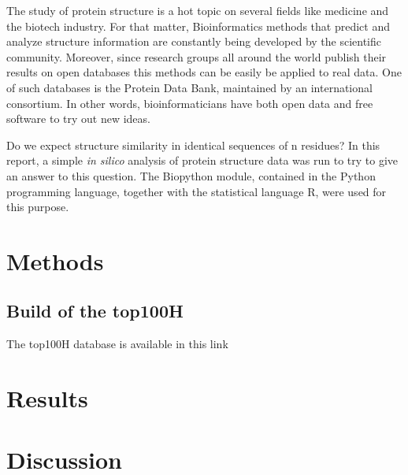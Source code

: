 \documentclass[a4paper, 11pt]{article} %
\begin{document}
The study of protein structure is a hot topic on several fields like medicine and the biotech industry. For that matter, Bioinformatics methods that predict and analyze structure information are constantly being developed by the scientific community. Moreover, since research groups all around the world publish their results on open databases this methods can be easily be applied to real data. One of such databases is the Protein Data Bank, maintained by an international consortium. In other words, bioinformaticians have both open data and free software to try out new ideas.


Do we expect structure similarity in identical sequences of n residues? In this report, a simple \textit{in silico} analysis of protein structure data was run to try to give an answer to this question. The Biopython module, contained in the Python programming language, together with the statistical language R, were used for this purpose.


\section{Methods}

\subsection{Build of the top100H}

The top100H database is available in this link

\section{Results}

\section{Discussion}
\end{document}
